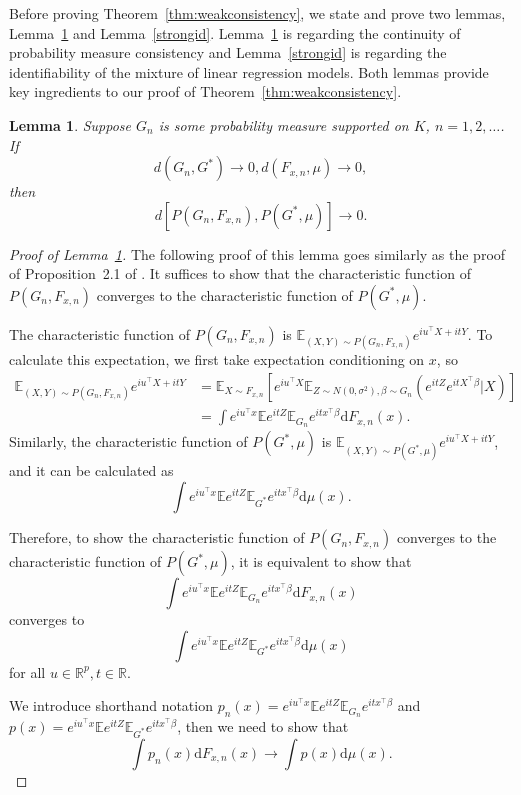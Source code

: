 \documentclass[11pt]{article}
\numberwithin{equation}{section}
\newtheorem{lemma}{Lemma}[section]
\newcommand{\RS}{\mathbb{R}}
\newcommand{\T}{ \top }
\newcommand{\E}{\mathbb{E}}
\begin{document}
\begin{appendices}
Before proving Theorem~\ref{thm:weakconsistency}, we state and prove two lemmas, Lemma~\ref{continuity} and Lemma~\ref{strongid}. Lemma~\ref{continuity} is regarding the continuity of probability measure consistency and Lemma~\ref{strongid} is regarding the identifiability of the mixture of linear regression models. Both lemmas provide key ingredients to our proof of Theorem~\ref{thm:weakconsistency}.

\begin{lemma}
\label{continuity}
Suppose $G_n$ is some probability measure supported on $K$, $n = 1,2,\dots$. If 
\[
d(G_n,G^*) \rightarrow 0, d(F_{x,n}, \mu) \rightarrow 0,
\]
then
\[
d[P(G_n,F_{x,n}), P(G^*,\mu)]\rightarrow 0.
\]
\end{lemma}
\begin{proof}[Proof of Lemma~\ref{continuity}]
The following proof of this lemma goes similarly as the proof of Proposition~2.1 of \cite{beran1994minimum}.
It suffices to show that the characteristic function of $P(G_n,F_{x,n})$ converges to the characteristic function of $P(G^*,\mu)$. 

The characteristic function of $P(G_n,F_{x,n})$ is $\E_{(X,Y) \sim P(G_n,F_{x,n})} e^{iu^\T X+ it Y}$. To calculate this expectation, we first take expectation conditioning on $x$, so 
\[
\begin{split}
\E_{(X,Y)\sim P(G_n,F_{x,n})} e^{iu^\T X+ it Y} & = \E_{X\sim F_{x,n}}\left[ e^{i u^\T X}\E_{Z\sim N(0,\sigma^2),\beta\sim G_n}(e^{itZ} e^{itX^\T\beta}|X)\right]\\
& = \int e^{iu^\T x} \E e^{itZ} \E_{G_n}e^{itx^\T\beta} \mathrm{d} F_{x,n}(x).
\end{split}
\]
Similarly, the characteristic function of $P(G^*,\mu)$ is $\E_{(X,Y) \sim P(G^*,\mu)} e^{iu^\T X+ it Y}$, and it can be calculated as 
\[
\int e^{iu^\T x} \E e^{itZ} \E_{G^*}e^{itx^\T\beta} \mathrm{d} \mu(x) .
\]

Therefore, to show the characteristic function of $P(G_n,F_{x,n})$ converges to the characteristic function of $P(G^*,\mu)$, it is equivalent to show that
\[
\int e^{iu^\T x} \E e^{itZ} \E_{G_n}e^{itx^\T\beta} \mathrm{d} F_{x,n}(x) 
\]
converges to 
\[
\int e^{iu^\T x} \E e^{itZ} \E_{G^*}e^{itx^\T\beta} \mathrm{d} \mu(x) 
\]
for all $u\in \RS^p, t \in \RS$.

We introduce shorthand notation $p_n(x) =  e^{iu^\T x} \E e^{itZ} \E_{G_n}e^{itx^\T \beta} $ and $p(x) =e^{iu^\T x} \E e^{itZ} \E_{G^*}e^{itx^\T \beta} $, then we need to show that
\[
\int p_n(x) \mathrm{d} F_{x,n}(x) \rightarrow \int p(x) \mathrm{d}\mu(x).
\]


\end{proof}
\end{appendices}
\end{document}
